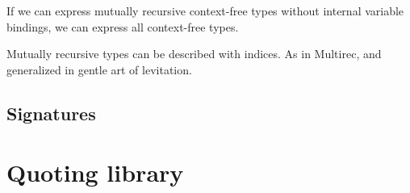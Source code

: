 If we can express mutually recursive context-free types without internal
variable bindings, we can express all context-free types.

Mutually recursive types can be described with indices. As in
Multirec, and generalized in gentle art of levitation.





\subsection{Signatures}


\section{Quoting library}\label{sec:quoting-library}






